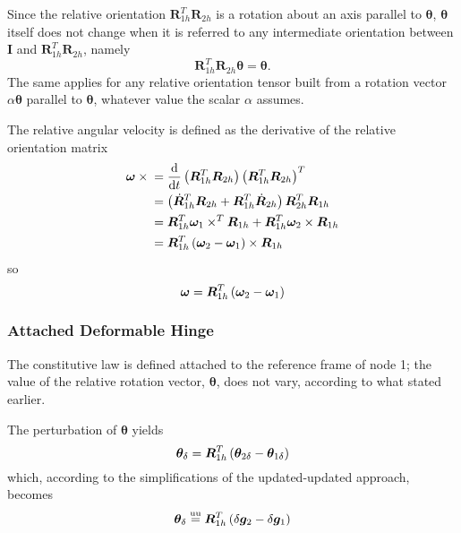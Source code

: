 \documentclass[10pt,fleqn,subeqn]{report}
\newcommand{\T}[1]{\bm{#1}}
\newcommand{\equu}{\overset{\text{uu}}{=}}
\begin{document}
Since the relative orientation $\T{R}_{1h}^T \T{R}_{2h}$ is a rotation 
about an axis parallel to $\T{\theta}$, $\T{\theta}$ itself
does not change when it is referred to any intermediate orientation
between $\T{I}$ and $\T{R}_{1h}^T \T{R}_{2h}$, namely
\begin{equation}
	\T{R}_{1h}^T \T{R}_{2h}\T{\theta} = \T{\theta} .
\end{equation}
The same applies for any relative orientation tensor built from a rotation
vector $\alpha\T{\theta}$ parallel to $\T{\theta}$, whatever value 
the scalar $\alpha$ assumes.

The relative angular velocity is defined as the derivative
of the relative orientation matrix
\begin{align}
	\T{\omega}\times{}
	&= \frac{\mathrm{d}}{\mathrm{d}t} \plbr{
		\T{R}_{1h}^T \T{R}_{2h}
	} \plbr{
		\T{R}_{1h}^T \T{R}_{2h}
	}^T \nonumber \\
	&= \plbr{
		\dot{\T{R}}_{1h}^T \T{R}_{2h}
		+ \T{R}_{1h}^T \dot{\T{R}}_{2h}
	} \T{R}_{2h}^T \T{R}_{1h} \nonumber \\
	&= \T{R}_{1h}^T \T{\omega}_1 \times^T \T{R}_{1h}
	+ \T{R}_{1h}^T \T{\omega}_2 \times \T{R}_{1h} \nonumber \\
	&= \T{R}_{1h}^T \plbr{
		\T{\omega}_2 - \T{\omega}_1
	}\times \T{R}_{1h}
\end{align}
so
\begin{equation}
	\T{\omega} = \T{R}_{1h}^T \plbr{
		\T{\omega}_2 - \T{\omega}_1
	}
	\label{eq:deformable-hinge-attached-omega}
\end{equation}



\subsubsection{Attached Deformable Hinge}
The constitutive law is defined attached to the reference frame of node 1;
the value of the relative rotation vector, $\T{\theta}$, does not vary,
according to what stated earlier.

The perturbation of $\T{\theta}$ yields
\begin{equation}
	\T{\theta}_{\delta} = \T{R}_{1h}^T\plbr{\T{\theta}_{2\delta} - \T{\theta}_{1\delta}}
	\label{eq:def-h-theta-delta}
\end{equation}
which, according to the simplifications of the updated-updated approach, becomes
\begin{equation}
	\T{\theta}_{\delta} \equu \T{R}_{1h}^T\plbr{\delta\T{g}_2 - \delta\T{g}_1}
\end{equation}
\end{document}
